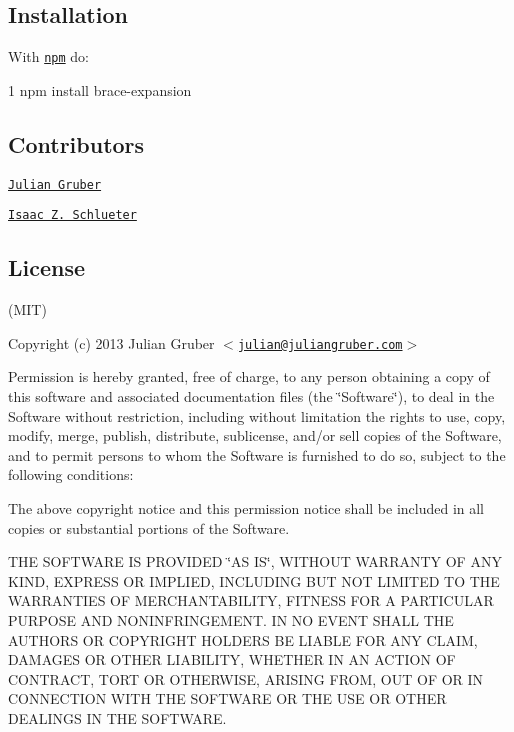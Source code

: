 \subsection*{Installation}

With \href{https://npmjs.org}{\tt npm} do\+:


\begin{DoxyCode}
1 npm install brace-expansion
\end{DoxyCode}


\subsection*{Contributors}


\begin{DoxyItemize}
\item \href{https://github.com/juliangruber}{\tt Julian Gruber}
\item \href{https://github.com/isaacs}{\tt Isaac Z. Schlueter}
\end{DoxyItemize}

\subsection*{License}

(M\+I\+T)

Copyright (c) 2013 Julian Gruber $<$\href{mailto:julian@juliangruber.com}{\tt julian@juliangruber.\+com}$>$

Permission is hereby granted, free of charge, to any person obtaining a copy of this software and associated documentation files (the \char`\"{}\+Software\char`\"{}), to deal in the Software without restriction, including without limitation the rights to use, copy, modify, merge, publish, distribute, sublicense, and/or sell copies of the Software, and to permit persons to whom the Software is furnished to do so, subject to the following conditions\+:

The above copyright notice and this permission notice shall be included in all copies or substantial portions of the Software.

T\+H\+E S\+O\+F\+T\+W\+A\+R\+E I\+S P\+R\+O\+V\+I\+D\+E\+D \char`\"{}\+A\+S I\+S\char`\"{}, W\+I\+T\+H\+O\+U\+T W\+A\+R\+R\+A\+N\+T\+Y O\+F A\+N\+Y K\+I\+N\+D, E\+X\+P\+R\+E\+S\+S O\+R I\+M\+P\+L\+I\+E\+D, I\+N\+C\+L\+U\+D\+I\+N\+G B\+U\+T N\+O\+T L\+I\+M\+I\+T\+E\+D T\+O T\+H\+E W\+A\+R\+R\+A\+N\+T\+I\+E\+S O\+F M\+E\+R\+C\+H\+A\+N\+T\+A\+B\+I\+L\+I\+T\+Y, F\+I\+T\+N\+E\+S\+S F\+O\+R A P\+A\+R\+T\+I\+C\+U\+L\+A\+R P\+U\+R\+P\+O\+S\+E A\+N\+D N\+O\+N\+I\+N\+F\+R\+I\+N\+G\+E\+M\+E\+N\+T. I\+N N\+O E\+V\+E\+N\+T S\+H\+A\+L\+L T\+H\+E A\+U\+T\+H\+O\+R\+S O\+R C\+O\+P\+Y\+R\+I\+G\+H\+T H\+O\+L\+D\+E\+R\+S B\+E L\+I\+A\+B\+L\+E F\+O\+R A\+N\+Y C\+L\+A\+I\+M, D\+A\+M\+A\+G\+E\+S O\+R O\+T\+H\+E\+R L\+I\+A\+B\+I\+L\+I\+T\+Y, W\+H\+E\+T\+H\+E\+R I\+N A\+N A\+C\+T\+I\+O\+N O\+F C\+O\+N\+T\+R\+A\+C\+T, T\+O\+R\+T O\+R O\+T\+H\+E\+R\+W\+I\+S\+E, A\+R\+I\+S\+I\+N\+G F\+R\+O\+M, O\+U\+T O\+F O\+R I\+N C\+O\+N\+N\+E\+C\+T\+I\+O\+N W\+I\+T\+H T\+H\+E S\+O\+F\+T\+W\+A\+R\+E O\+R T\+H\+E U\+S\+E O\+R O\+T\+H\+E\+R D\+E\+A\+L\+I\+N\+G\+S I\+N T\+H\+E S\+O\+F\+T\+W\+A\+R\+E. 
